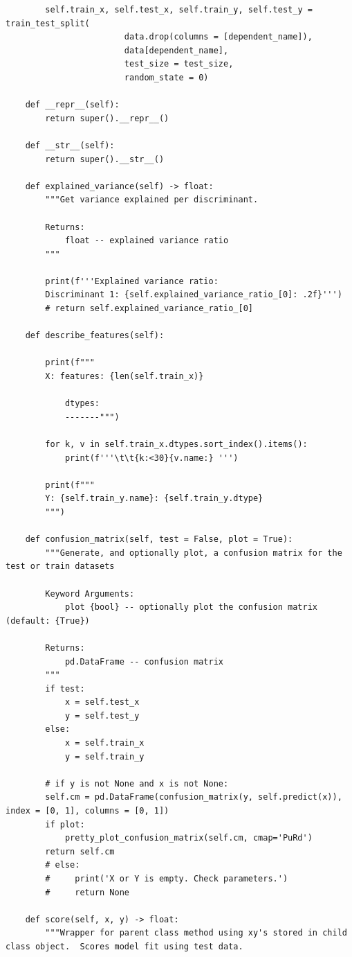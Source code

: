 \begin{verbatim}
        self.train_x, self.test_x, self.train_y, self.test_y = train_test_split(
                        data.drop(columns = [dependent_name]),
                        data[dependent_name],
                        test_size = test_size,
                        random_state = 0)

    def __repr__(self):
        return super().__repr__()

    def __str__(self):
        return super().__str__()

    def explained_variance(self) -> float:
        """Get variance explained per discriminant.

        Returns:
            float -- explained variance ratio
        """

        print(f'''Explained variance ratio:
        Discriminant 1: {self.explained_variance_ratio_[0]: .2f}''')
        # return self.explained_variance_ratio_[0]

    def describe_features(self):

        print(f"""
        X: features: {len(self.train_x)}

            dtypes:
            -------""")

        for k, v in self.train_x.dtypes.sort_index().items():
            print(f'''\t\t{k:<30}{v.name:} ''')

        print(f"""
        Y: {self.train_y.name}: {self.train_y.dtype}
        """)

    def confusion_matrix(self, test = False, plot = True):
        """Generate, and optionally plot, a confusion matrix for the test or train datasets

        Keyword Arguments:
            plot {bool} -- optionally plot the confusion matrix (default: {True})

        Returns:
            pd.DataFrame -- confusion matrix
        """
        if test:
            x = self.test_x
            y = self.test_y
        else:
            x = self.train_x
            y = self.train_y

        # if y is not None and x is not None:
        self.cm = pd.DataFrame(confusion_matrix(y, self.predict(x)), index = [0, 1], columns = [0, 1])
        if plot:
            pretty_plot_confusion_matrix(self.cm, cmap='PuRd')
        return self.cm
        # else:
        #     print('X or Y is empty. Check parameters.')
        #     return None

    def score(self, x, y) -> float:
        """Wrapper for parent class method using xy's stored in child class object.  Scores model fit using test data.


\end{verbatim}
